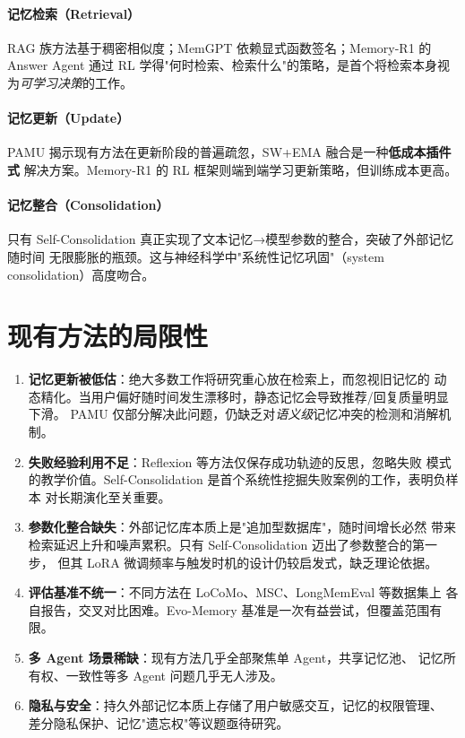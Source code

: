 \documentclass[11pt,a4paper]{article}
\begin{document}
\paragraph{记忆检索（Retrieval）}
RAG 族方法基于稠密相似度；MemGPT 依赖显式函数签名；Memory-R1 的 Answer Agent
通过 RL 学得"何时检索、检索什么"的策略，是首个将检索本身视为\emph{可学习决策}的工作。

\paragraph{记忆更新（Update）}
PAMU 揭示现有方法在更新阶段的普遍疏忽，SW+EMA 融合是一种\textbf{低成本插件式}
解决方案。Memory-R1 的 RL 框架则端到端学习更新策略，但训练成本更高。

\paragraph{记忆整合（Consolidation）}
只有 Self-Consolidation 真正实现了文本记忆→模型参数的整合，突破了外部记忆随时间
无限膨胀的瓶颈。这与神经科学中"系统性记忆巩固"（system consolidation）高度吻合。

\section{现有方法的局限性}

\begin{enumerate}
  \item \textbf{记忆更新被低估}：绝大多数工作将研究重心放在检索上，而忽视旧记忆的
    动态精化。当用户偏好随时间发生漂移时，静态记忆会导致推荐/回复质量明显下滑。
    PAMU 仅部分解决此问题，仍缺乏对\emph{语义级}记忆冲突的检测和消解机制。

  \item \textbf{失败经验利用不足}：Reflexion 等方法仅保存成功轨迹的反思，忽略失败
    模式的教学价值。Self-Consolidation 是首个系统性挖掘失败案例的工作，表明负样本
    对长期演化至关重要。

  \item \textbf{参数化整合缺失}：外部记忆库本质上是"追加型数据库"，随时间增长必然
    带来检索延迟上升和噪声累积。只有 Self-Consolidation 迈出了参数整合的第一步，
    但其 LoRA 微调频率与触发时机的设计仍较启发式，缺乏理论依据。

  \item \textbf{评估基准不统一}：不同方法在 LoCoMo、MSC、LongMemEval 等数据集上
    各自报告，交叉对比困难。Evo-Memory 基准是一次有益尝试，但覆盖范围有限。

  \item \textbf{多 Agent 场景稀缺}：现有方法几乎全部聚焦单 Agent，共享记忆池、
    记忆所有权、一致性等多 Agent 问题几乎无人涉及。

  \item \textbf{隐私与安全}：持久外部记忆本质上存储了用户敏感交互，记忆的权限管理、
    差分隐私保护、记忆"遗忘权"等议题亟待研究。
\end{enumerate}
\end{document}
